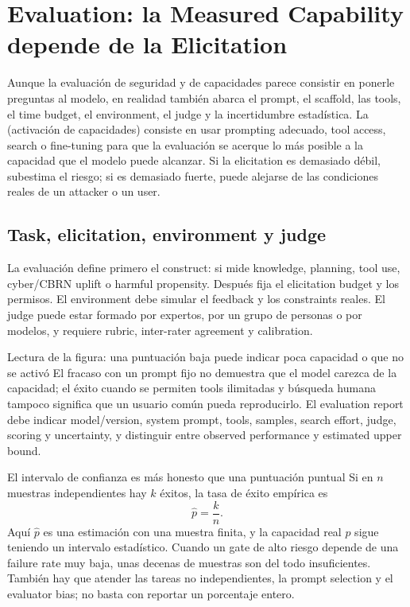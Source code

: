 \section{Evaluation: la Measured Capability depende de la Elicitation}

Aunque la evaluación de seguridad y de capacidades parece consistir en ponerle preguntas al modelo, en realidad también abarca el prompt, el scaffold, las tools, el time budget, el environment, el judge y la incertidumbre estadística. La  (activación de capacidades) consiste en usar prompting adecuado, tool access, search o fine-tuning para que la evaluación se acerque lo más posible a la capacidad que el modelo puede alcanzar. Si la elicitation es demasiado débil, subestima el riesgo; si es demasiado fuerte, puede alejarse de las condiciones reales de un attacker o un user.

\subsection{Task, elicitation, environment y judge}

La evaluación define primero el construct: si mide knowledge, planning, tool use, cyber/CBRN uplift o harmful propensity. Después fija el elicitation budget y los permisos. El environment debe simular el feedback y los constraints reales. El judge puede estar formado por expertos, por un grupo de personas o por modelos, y requiere rubric, inter-rater agreement y calibration.


\begin{knowledgebox}{Lectura de la figura: una puntuación baja puede indicar poca capacidad o que no se activó}
El fracaso con un prompt fijo no demuestra que el model carezca de la capacidad; el éxito cuando se permiten tools ilimitadas y búsqueda humana tampoco significa que un usuario común pueda reproducirlo. El evaluation report debe indicar model/version, system prompt, tools, samples, search effort, judge, scoring y uncertainty, y distinguir entre observed performance y estimated upper bound.
\end{knowledgebox}

\begin{importantbox}{El intervalo de confianza es más honesto que una puntuación puntual}
Si en $n$ muestras independientes hay $k$ éxitos, la tasa de éxito empírica es
\[
\hat p=\frac{k}{n}.
\]
Aquí $\hat p$ es una estimación con una muestra finita, y la capacidad real $p$ sigue teniendo un intervalo estadístico. Cuando un gate de alto riesgo depende de una failure rate muy baja, unas decenas de muestras son del todo insuficientes. También hay que atender las tareas no independientes, la prompt selection y el evaluator bias; no basta con reportar un porcentaje entero.
\end{importantbox}

